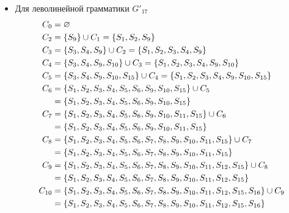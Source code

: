 \begin{itemize}
	\item Для леволинейной грамматики \(G'_{17}\)
	      \begin{align*}
		      C_0    & = \varnothing                                                                                           \\
		      C_{2}  & = \cbr{S_9} \cup C_{1} = \cbr{S_1, S_2, S_9}                                                            \\
		      C_{3}  & = \cbr{S_3, S_4, S_9} \cup C_{2} = \cbr{S_1, S_2, S_3, S_4, S_9}                                        \\
		      C_{4}  & = \cbr{S_3, S_4, S_9, S_{10}} \cup C_{3} = \cbr{S_1, S_2, S_3, S_4, S_9, S_{10}}                        \\
		      C_{5}  & = \cbr{S_3, S_4, S_9, S_{10}, S_{15}} \cup C_{4} = \cbr{S_1, S_2, S_3, S_4, S_9, S_{10}, S_{15}}        \\
		      C_{6}  & = \cbr{S_1, S_2, S_3, S_4, S_5, S_6, S_9, S_{10}, S_{15}} \cup C_{5}                                    \\
		             & = \cbr{S_1, S_2, S_3, S_4, S_5, S_6, S_9, S_{10}, S_{15}}                                               \\
		      C_{7}  & = \cbr{S_1, S_2, S_3, S_4, S_5, S_6, S_9, S_{10}, S_{11}, S_{15}} \cup C_{6}                            \\
		             & = \cbr{S_1, S_2, S_3, S_4, S_5, S_6, S_9, S_{10}, S_{11}, S_{15}}                                       \\
		      C_{8}  & = \cbr{S_1, S_2, S_3, S_4, S_5, S_6, S_7, S_8, S_9, S_{10}, S_{11}, S_{15}} \cup C_{7}                  \\
		             & = \cbr{S_1, S_2, S_3, S_4, S_5, S_6, S_7, S_8, S_9, S_{10}, S_{11}, S_{15}}                             \\
		      C_{9}  & = \cbr{S_1, S_2, S_3, S_4, S_5, S_6, S_7, S_8, S_9, S_{10}, S_{11}, S_{12}, S_{15}} \cup C_{8}          \\
		             & = \cbr{S_1, S_2, S_3, S_4, S_5, S_6, S_7, S_8, S_9, S_{10}, S_{11}, S_{12}, S_{15}}                     \\
		      C_{10} & = \cbr{S_1, S_2, S_3, S_4, S_5, S_6, S_7, S_8, S_9, S_{10}, S_{11}, S_{12}, S_{15}, S_{16}} \cup C_{9}  \\
		             & = \cbr{S_1, S_2, S_3, S_4, S_5, S_6, S_7, S_8, S_9, S_{10}, S_{11}, S_{12}, S_{15}, S_{16}}             \\

\end{align*}
\end{itemize}
